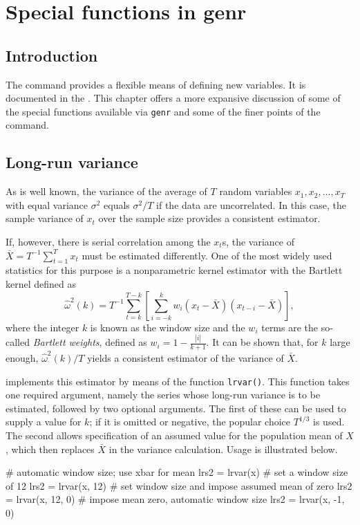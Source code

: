 \chapter{Special functions in genr}
\label{chap:genr}

\section{Introduction}
\label{genr-intro}

The  command provides a flexible means of defining new
variables.  It is documented in the \GCR.  This chapter offers a more
expansive discussion of some of the special functions available via
\verb+genr+ and some of the finer points of the command.
    
\section{Long-run variance}
\label{sec:lrvar}

As is well known, the variance of the average of $T$ random variables
$x_1, x_2, \ldots, x_T$ with equal variance $\sigma^2$ equals
$\sigma^2/T$ if the data are uncorrelated. In this case, the sample
variance of $x_t$ over the sample size provides a consistent estimator.

If, however, there is serial correlation among the $x_t$s, the
variance of $\bar{X} = T^{-1} \sum_{t=1}^T x_t$ must be estimated
differently. One of the most widely used statistics for this purpose
is a nonparametric kernel estimator with the Bartlett kernel defined
as
\begin{equation}
  \label{eq:scalar-lrvar}
  \hat{\omega}^2(k) = T^{-1} \sum_{t=k}^{T-k} \left[ \sum_{i=-k}^k w_i (x_t -
  \bar{X}) (x_{t-i} - \bar{X}) \right] ,
\end{equation}
where the integer $k$ is known as the window size and the $w_i$ terms
are the so-called \emph{Bartlett weights}, defined as $w_i = 1 -
\frac{|i|}{k + 1}$. It can be shown that, for $k$ large enough,
$\hat{\omega}^2(k)/T$ yields a consistent estimator of the variance of
$\bar{X}$.

 implements this estimator by means of the function
\texttt{lrvar()}. This function takes one required argument, namely
the series whose long-run variance is to be estimated, followed by two
optional arguments. The first of these can be used to supply a value
for $k$; if it is omitted or negative, the popular choice $T^{1/3}$ is
used. The second allows specification of an assumed value for the
population mean of $X$, which then replaces $\bar{X}$ in the variance
calculation. Usage is illustrated below.
\begin{code}
# automatic window size; use xbar for mean
lrs2 = lrvar(x)
# set a window size of 12
lrs2 = lrvar(x, 12)
# set window size and impose assumed mean of zero
lrs2 = lrvar(x, 12, 0)
# impose mean zero, automatic window size
lrs2 = lrvar(x, -1, 0)
\end{code}


